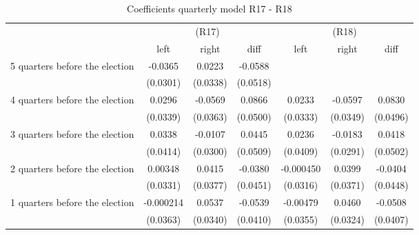 \begin{table}[!ht]\centering \footnotesize
\def\sym#1{\ifmmode^{#1}\else\(^{#1}\)\fi}
\caption{Coefficients quarterly model R17 - R18}
\begin{tabular}{l*{6}{c}}
\hline\hline
                    &\multicolumn{3}{c}{(R17)}&\multicolumn{3}{c}{(R18)}\\
&\multicolumn{1}{c}{left}&\multicolumn{1}{c}{right}&\multicolumn{1}{c}{diff}&\multicolumn{1}{c}{left}&\multicolumn{1}{c}{right}&\multicolumn{1}{c}{diff}\\
\hline
 5 quarters before the election&     -0.0365         &      0.0223         &     -0.0588         &                     &                     &                     \\
                    &    (0.0301)         &    (0.0338)         &    (0.0518)         &                     &                     &                     \\
[0.5em]
 4 quarters before the election&      0.0296         &     -0.0569         &      0.0866         &      0.0233         &     -0.0597         &      0.0830         \\
                    &    (0.0339)         &    (0.0363)         &    (0.0500)         &    (0.0333)         &    (0.0349)         &    (0.0496)         \\
[0.5em]
 3 quarters before the election&      0.0338         &     -0.0107         &      0.0445         &      0.0236         &     -0.0183         &      0.0418         \\
                    &    (0.0414)         &    (0.0300)         &    (0.0509)         &    (0.0409)         &    (0.0291)         &    (0.0502)         \\
[0.5em]
 2 quarters before the election&     0.00348         &      0.0415         &     -0.0380         &   -0.000450         &      0.0399         &     -0.0404         \\
                    &    (0.0331)         &    (0.0377)         &    (0.0451)         &    (0.0316)         &    (0.0371)         &    (0.0448)         \\
[0.5em]
 1 quarters before the election&   -0.000214         &      0.0537         &     -0.0539         &    -0.00479         &      0.0460         &     -0.0508         \\
                    &    (0.0363)         &    (0.0340)         &    (0.0410)         &    (0.0355)         &    (0.0324)         &    (0.0407)         \\

\end{tabular}
\end{table}
